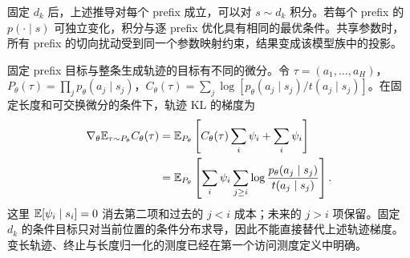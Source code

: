 固定 $d_k$ 后，上述推导对每个 prefix 成立，可以对 $s\sim d_k$ 积分。若每个 prefix 的 $p(\cdot\mid s)$ 可独立变化，积分与逐 prefix 优化具有相同的最优条件。共享参数时，所有 prefix 的切向扰动受到同一个参数映射约束，结果变成该模型族中的投影。

固定 prefix 目标与整条生成轨迹的目标有不同的微分。令 $\tau=(a_1,\ldots,a_H)$，$P_\theta(\tau)=\prod_jp_\theta(a_j\mid s_j)$，$C_\theta(\tau)=\sum_j\log[p_\theta(a_j\mid s_j)/t(a_j\mid s_j)]$。在固定长度和可交换微分的条件下，轨迹 KL 的梯度为
\begin{align}
\nabla_\theta\mathbb E_{\tau\sim P_\theta}C_\theta(\tau)
&=\mathbb E_{P_\theta}\left[C_\theta(\tau)\sum_i\psi_i+\sum_i\psi_i\right]\\
&=\mathbb E_{P_\theta}\left[\sum_i\psi_i\sum_{j\ge i}
\log\frac{p_\theta(a_j\mid s_j)}{t(a_j\mid s_j)}\right].
\end{align}
这里 $\mathbb E[\psi_i\mid s_i]=0$ 消去第二项和过去的 $j<i$ 成本；未来的 $j>i$ 项保留。固定 $d_k$ 的条件目标只对当前位置的条件分布求导，因此不能直接替代上述轨迹梯度。变长轨迹、终止与长度归一化的测度已经在第一个访问测度定义中明确。
